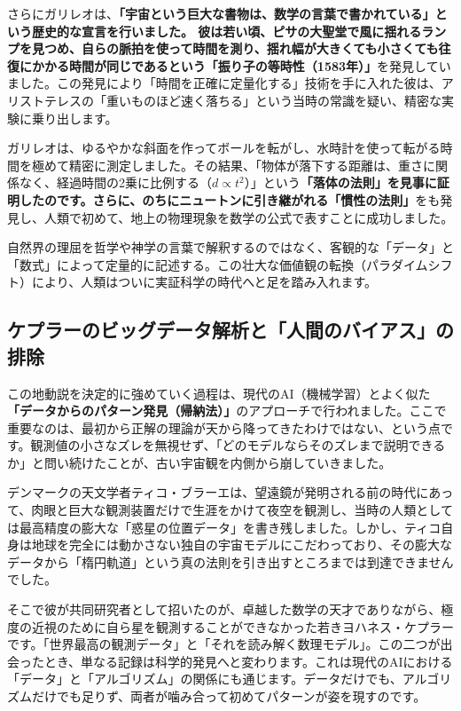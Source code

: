 さらにガリレオは、\textbf{「宇宙という巨大な書物は、数学の言葉で書かれている」という歴史的な宣言を行いました。 彼は若い頃、ピサの大聖堂で風に揺れるランプを見つめ、自らの脈拍を使って時間を測り、揺れ幅が大きくても小さくても往復にかかる時間が同じであるという「振り子の等時性（1583年）」}を発見していました。この発見により「時間を正確に定量化する」技術を手に入れた彼は、アリストテレスの「重いものほど速く落ちる」という当時の常識を疑い、精密な実験に乗り出します。

ガリレオは、ゆるやかな斜面を作ってボールを転がし、水時計を使って転がる時間を極めて精密に測定しました。その結果、「物体が落下する距離は、重さに関係なく、経過時間の2乗に比例する（\(d \propto t^2\)）」という\textbf{「落体の法則」を見事に証明したのです。さらに、のちにニュートンに引き継がれる「慣性の法則」}をも発見し、人類で初めて、地上の物理現象を数学の公式で表すことに成功しました。

自然界の理屈を哲学や神学の言葉で解釈するのではなく、客観的な「データ」と「数式」によって定量的に記述する。この壮大な価値観の転換（パラダイムシフト）により、人類はついに実証科学の時代へと足を踏み入れます。

\subsection{ケプラーのビッグデータ解析と「人間のバイアス」の排除}

この地動説を決定的に強めていく過程は、現代のAI（機械学習）とよく似た\textbf{「データからのパターン発見（帰納法）」}のアプローチで行われました。ここで重要なのは、最初から正解の理論が天から降ってきたわけではない、という点です。観測値の小さなズレを無視せず、「どのモデルならそのズレまで説明できるか」と問い続けたことが、古い宇宙観を内側から崩していきました。

デンマークの天文学者ティコ・ブラーエは、望遠鏡が発明される前の時代にあって、肉眼と巨大な観測装置だけで生涯をかけて夜空を観測し、当時の人類としては最高精度の膨大な「惑星の位置データ」を書き残しました。しかし、ティコ自身は地球を完全には動かさない独自の宇宙モデルにこだわっており、その膨大なデータから「楕円軌道」という真の法則を引き出すところまでは到達できませんでした。

そこで彼が共同研究者として招いたのが、卓越した数学の天才でありながら、極度の近視のために自ら星を観測することができなかった若きヨハネス・ケプラーです。「世界最高の観測データ」と「それを読み解く数理モデル」。この二つが出会ったとき、単なる記録は科学的発見へと変わります。これは現代のAIにおける「データ」と「アルゴリズム」の関係にも通じます。データだけでも、アルゴリズムだけでも足りず、両者が噛み合って初めてパターンが姿を現すのです。

